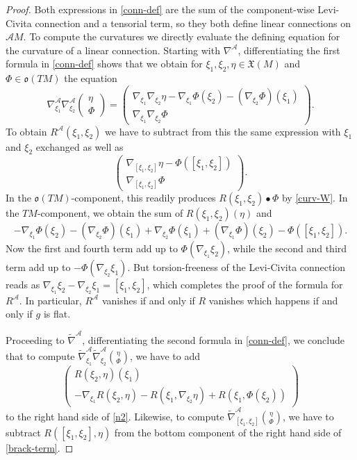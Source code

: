 \documentclass[12pt,a4paper]{amsart}
\def\frak{\mathfrak}
\def\Cal{\mathcal}
\newcommand{\Ph}{\Phi}
\newcommand{\tn}{\widetilde{\nabla}}
\numberwithin{theorem}{section}
\numberwithin{equation}{section}
\theoremstyle{definition}
\theoremstyle{remark}
\begin{document}
\begin{proof}
Both expressions in \eqref{conn-def} are the sum of the component-wise Levi-Civita
connection and a tensorial term, so they both define linear connections on $\Cal
AM$. To compute the curvatures we directly evaluate the defining equation for the
curvature of a linear connection. Starting with $\nabla^{\Cal A}$, differentiating the
first formula in \eqref{conn-def} shows that we obtain for $\xi_1,\xi_2,\eta\in\frak
X(M)$ and $\Ph\in\frak o(TM)$ the equation
\begin{equation}\label{n2}
\nabla^{\Cal A}_{\xi_1}\nabla^{\Cal
  A}_{\xi_2}\begin{pmatrix}\eta\\ \Phi \end{pmatrix}=
\begin{pmatrix}
  \nabla_{\xi_1}\nabla_{\xi_2}\eta-\nabla_{\xi_1}\Phi(\xi_2)-(\nabla_{\xi_2}\Phi)(\xi_1)\\
  \nabla_{\xi_1}\nabla_{\xi_2}\Phi
\end{pmatrix}. 
\end{equation}
To obtain $R^{\Cal A}(\xi_1,\xi_2)$ we have to subtract from this the same expression
with $\xi_1$ and $\xi_2$ exchanged as well as
\begin{equation}\label{brack-term}
  \begin{pmatrix} \nabla_{[\xi_1,\xi_2]}\eta-\Ph([\xi_1,\xi_2])\\
    \nabla_{[\xi_1,\xi_2]}\Phi\end{pmatrix}.
\end{equation}    
In the $\frak o(TM)$-component, this readily produces $R(\xi_1,\xi_2)\bullet \Phi$ by
\eqref{curv-W}. In the $TM$-component, we obtain the sum of $R(\xi_1,\xi_2)(\eta)$
and
\begin{equation}\label{nb}
-\nabla_{\xi_1}\Phi(\xi_2)-(\nabla_{\xi_2}\Phi)(\xi_1)+\nabla_{\xi_2}\Phi(\xi_1)+
(\nabla_{\xi_1}\Phi)(\xi_2)-\Phi([\xi_1,\xi_2]). 
\end{equation}
Now the first and fourth term add up to $\Ph(\nabla_{\xi_1}\xi_2)$, while the second
and third term add up to $-\Ph(\nabla_{\xi_2}\xi_1)$. But torsion-freeness of the
Levi-Civita connection reads as
$\nabla_{\xi_1}\xi_2-\nabla_{\xi_2}\xi_1=[\xi_1,\xi_2]$, which completes the proof of
the formula for $R^{\Cal A}$. In particular, $R^{\Cal A}$ vanishes if and only if $R$
vanishes which happens if and only if $g$ is flat.

Proceeding to $\tn^{\Cal A}$, differentiating the second formula in \eqref{conn-def},
we conclude that to compute $\tn^{\Cal A}_{\xi_1}\tn^{\Cal
  A}_{\xi_2}\binom{\eta}{\Phi}$, we have to add
\begin{equation}\label{tn2}
\begin{pmatrix} R(\xi_2,\eta)(\xi_1) \\ -\nabla_{\xi_1}R(\xi_2,\eta) -
  R(\xi_1,\nabla_{\xi_2}\eta)+R(\xi_1,\Phi(\xi_2)) 
\end{pmatrix}
\end{equation}
  to the right hand side of \eqref{n2}. Likewise, to compute $\tn^{\Cal
    A}_{[\xi_1,\xi_2]}\binom{\eta}{\Phi}$, we have to subtract
  $R([\xi_1,\xi_2],\eta)$ from the bottom component of the right hand side of
  \eqref{brack-term}.


\end{proof}
\end{document}
